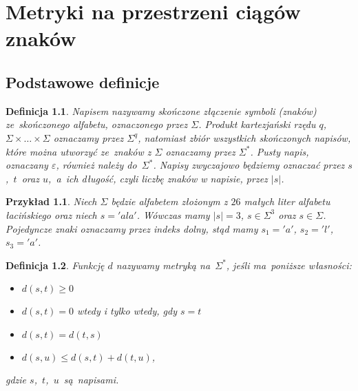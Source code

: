 \documentclass[12pt, twoside, openany]{report}
\theoremstyle{plain}
\newtheorem{defi}{Definicja}[section]
\newtheorem{prz}{Przykład}[section]
\begin{document}

%

\chapter{Metryki na przestrzeni ciągów
znaków}\label{metryki-na-przestrzeni-ciagow-znakow}

\section{Podstawowe definicje}

\begin{defi}
\emph{Napisem} nazywamy skończone złączenie symboli (znaków) ze~skończonego \emph{alfabetu}, oznaczonego przez $\Sigma$. Produkt kartezjański rzędu $q$, $\Sigma\times\ldots\times\Sigma$ oznaczamy przez $\Sigma^q$, natomiast zbiór wszystkich skończonych napisów, które można utworzyć ze~znaków z $\Sigma$ oznaczamy przez $\Sigma^*$. \emph{Pusty napis}, oznaczany $\varepsilon$, również należy do~$\Sigma^*$. Napisy zwyczajowo będziemy oznaczać przez $s$,~$t$~oraz $u$,~a~ich \emph{długość}, czyli liczbę znaków w napisie, przez $|s|$.
\end{defi}


\begin{prz}
Niech $\Sigma$ będzie alfabetem złożonym z $26$ małych liter alfabetu łacińskiego oraz niech $s = 'ala'$. Wówczas mamy $|s| = 3$, $s \in \Sigma^3$ oraz $s \in \Sigma$. Pojedyncze znaki oznaczamy przez indeks dolny, stąd mamy $s_1 = 'a'$, $s_2 = 'l'$, $s_3 = 'a'$. %
\cite{Loo2014:stringdist}
\end{prz}

\begin{defi}
Funkcję $d$ nazywamy \emph{metryką} na~$\Sigma^*$, jeśli ma~poniższe własności:
\begin{itemize}
\item $d(s,t) \geq 0$
\item $d(s,t) = 0$ wtedy i tylko wtedy, gdy $s = t$
\item $d(s,t) = d(t,s)$
\item $d(s,u) \leq d(s,t) + d(t,u)$,
\end{itemize}
gdzie $s$,~$t$,~$u$~są~napisami.
\end{defi}
\end{document}
